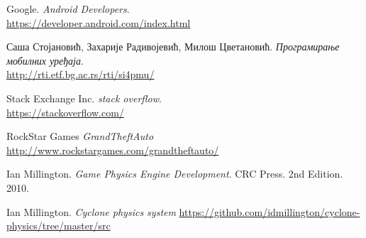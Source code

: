 


\begin{thebibliography}{refs}
		Google.
		\emph{Android Developers}.\\
		\url{https://developer.android.com/index.html}
		
		Саша Стојановић, Захарије Радивојевић, Милош Цветановић.
		\emph{Програмирање мобилних уређаја}.\\
		\url{http://rti.etf.bg.ac.rs/rti/si4pmu/}
		
		Stack Exchange Inc.
		\emph{stack overflow}.\\
		\url{https://stackoverflow.com/}
		
		RockStar Games 
		\emph{GrandTheftAuto}
		\url{http://www.rockstargames.com/grandtheftauto/}
		
		Ian Millington. 
		\emph{Game Physics Engine Development}.
		CRC Press.
		2nd Edition. 2010.
		
		
		Ian Millington. 
		\emph{Cyclone physics system}
		\url{https://github.com/idmillington/cyclone-physics/tree/master/src}
		
		
		
		
		
		


\end{thebibliography}